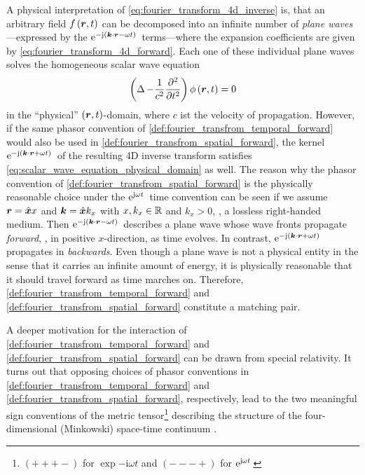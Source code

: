 A physical interpretation of \eqref{eq:fourier_transform_4d_inverse} is,
that an arbitrary field $f \left( \robs, t \right)$ can be decomposed 
into an infinite number of \emph{plane waves}---expressed by the
$\exp{-\im \left( \pvec{k} \cdot \robs - \omega t \right)}$ terms---where
the expansion coefficients are given by \eqref{eq:fourier_transform_4d_forward}.
Each one of these individual plane waves solves
the homogeneous scalar wave equation \cite[p.~32]{Sommerfeld1964}
\begin{equation}\label{eq:scalar_wave_equation_physical_domain}
	\left( \laplace - \frac{1}{c^2} \frac{\partial^2}{\partial t^2} \right)	
	\phi \left( \pvec{r}, t \right) = 0
\end{equation}
in the \enquote{physical} $\left(\pvec{r}, t\right)$-domain, where $c$ ist
the velocity of propagation.
However, if the same phasor convention of
\cref{def:fourier_transfrom_temporal_forward} would also be used in
\cref{def:fourier_transfrom_spatial_forward}, the kernel
$\exp{-\im \left( \pvec{k} \cdot \robs + \omega t \right)}$
of the resulting 4D inverse transform satisfies
\eqref{eq:scalar_wave_equation_physical_domain} as well.
The reason why the phasor convention of
\cref{def:fourier_transfrom_spatial_forward} is the physically reasonable choice
under the $\mathrm{e}^{\mathrm{j} \omega t}\,$ time convention
can be seen if we assume $\pvec{r} = \uv{x} x$ and $\pvec{k} = \uv{x} k_x$
with $x, k_x \in \mathbb{R}$ and $k_x > 0$, \ie, a lossless right-handed medium.
Then $\exp{-\im \left( \pvec{k} \cdot \robs - \omega t \right)}$ describes
a plane wave whose wave fronts propagate \emph{forward}, \ie, in positive
$x$-direction, as time evolves.
In contrast,
$\exp{-\im \left( \pvec{k} \cdot \robs + \omega t \right)}$
propagates in \emph{backwards}.
Even though a plane wave is not a physical entity in the sense that it carries
an infinite amount of energy, it is physically reasonable that it should
travel forward as time marches on.
Therefore, \cref{def:fourier_transfrom_temporal_forward} and
\cref{def:fourier_transfrom_spatial_forward} constitute a matching pair.

A deeper motivation for the interaction of
\cref{def:fourier_transfrom_temporal_forward} and 
\cref{def:fourier_transfrom_spatial_forward} can be drawn from special
relativity.
It turns out that opposing choices of phasor conventions in
\cref{def:fourier_transfrom_temporal_forward} and
\cref{def:fourier_transfrom_spatial_forward}, respectively, lead to the two
meaningful sign conventions of the metric tensor\footnote{
	$\left( + + + - \right)$ for $\exp{-\mathrm{i} \omega t}$
	and $\left( - - - + \right)$ for $\mathrm{e}^{\mathrm{j} \omega t}\,$}
describing the structure of the four-dimensional (Minkowski) space-time
continuum \cite[pp.~624]{Jackson2013}\cite{Kaiser2016}.






